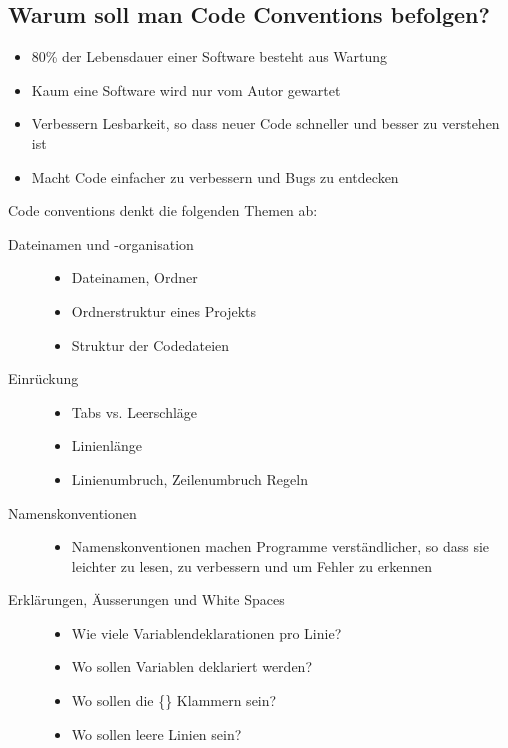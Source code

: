 \documentclass[a4paper,10pt]{article}
\begin{document}
\subsection{Warum soll man Code Conventions befolgen?}
\begin{itemize}
\item 80\% der Lebensdauer einer Software besteht aus Wartung
\item Kaum eine Software wird nur vom Autor gewartet
\item Verbessern Lesbarkeit, so dass neuer Code schneller und besser zu verstehen ist
\item Macht Code einfacher zu verbessern und Bugs zu entdecken
\end{itemize}
Code conventions denkt die folgenden Themen ab: 
\begin{description}
	\item[Dateinamen und -organisation] \hfill 
		\begin{itemize}
			\item Dateinamen, Ordner
			\item Ordnerstruktur eines Projekts
			\item Struktur der Codedateien
		\end{itemize}
	\item[Einrückung] \hfill
		\begin{itemize}
			\item Tabs vs. Leerschläge
			\item Linienlänge
			\item Linienumbruch, Zeilenumbruch Regeln
		\end{itemize}
	\item[Namenskonventionen] \hfill
		\begin{itemize}
			\item Namenskonventionen machen Programme verständlicher, so dass sie leichter zu lesen, zu verbessern und um Fehler zu erkennen
		\end{itemize}
	\item[Erklärungen, Äusserungen und White Spaces] \hfill 
		\begin{itemize}
			\item Wie viele Variablendeklarationen pro Linie?
			\item Wo sollen Variablen deklariert werden?
			\item Wo sollen die \{\} Klammern sein?
			\item Wo sollen leere Linien sein?
		\end{itemize}
\end{description}
\end{document}
